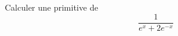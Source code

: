 Calculer une primitive de 
\begin{displaymath}
 \frac{1}{e^x + 2e^{-x}}
\end{displaymath}
\bigskip \bigskip